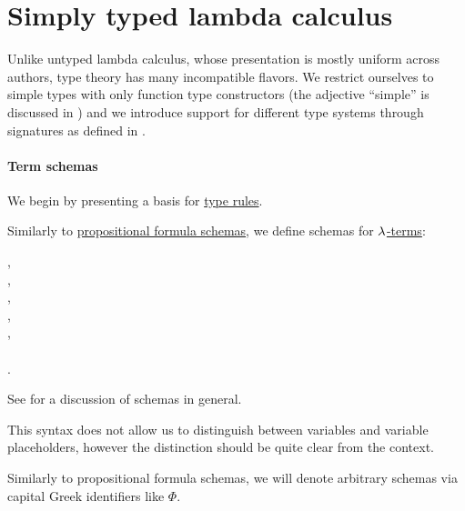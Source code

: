 \section{Simply typed lambda calculus}\label{sec:simply_typed_lambda_calculus}

Unlike untyped lambda calculus, whose presentation is mostly uniform across authors, type theory has many incompatible flavors. We restrict ourselves to simple types with only function type constructors (the adjective \enquote{simple} is discussed in ) and we introduce support for different type systems through signatures as defined in .

\paragraph{Term schemas}\hfill

We begin by presenting a basis for \hyperref[def:simple_type_system]{type rules}.

\begin{definition}\label{def:lambda_term_schema}
  Similarly to \hyperref[def:propositional_formula_schema]{propositional formula schemas}, we define schemas for \hyperref[def:lambda_term]{\( \synlambda \)-terms}:
  \begin{bnf*}
     {}, \\
              { \bnfor {}}, \\
         {}, \\
       {\bnftsq{\( ( \)} \bnfsp {} \bnfsp {} \bnfsp \bnftsq{\( ) \)}}, \\
       {\bnftsq{\( ( \)} \bnfsp \bnftsq{\( \synlambda \)} \bnfsp {} \bnfsp {} \bnfsp {} \bnfsp \bnftsq{\( ) \)}}, \\
              { \bnfor {} \bnfor} \\
    .
  \end{bnf*}
\end{definition}
\begin{comments}
  \item See  for a discussion of schemas in general.

  \item This syntax does not allow us to distinguish between variables and variable placeholders, however the distinction should be quite clear from the context.

  \item Similarly to propositional formula schemas, we will denote arbitrary schemas via capital Greek identifiers like \( \Phi \).
\end{comments}

